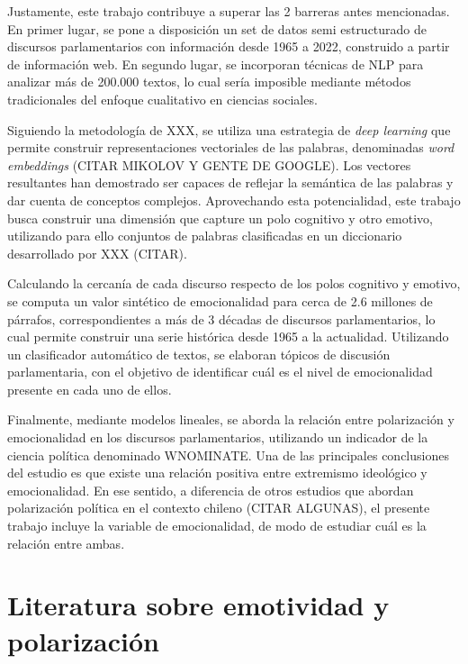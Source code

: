 \documentclass[
  12pt,
]{article}
\begin{document}
Justamente, este trabajo contribuye a superar las 2 barreras antes
mencionadas. En primer lugar, se pone a disposición un set de datos semi
estructurado de discursos parlamentarios con información desde 1965 a
2022, construido a partir de información web. En segundo lugar, se
incorporan técnicas de NLP para analizar más de 200.000 textos, lo cual
sería imposible mediante métodos tradicionales del enfoque cualitativo
en ciencias sociales.

Siguiendo la metodología de XXX, se utiliza una estrategia de \emph{deep
learning} que permite construir representaciones vectoriales de las
palabras, denominadas \emph{word embeddings} (CITAR MIKOLOV Y GENTE DE
GOOGLE). Los vectores resultantes han demostrado ser capaces de reflejar
la semántica de las palabras y dar cuenta de conceptos complejos.
Aprovechando esta potencialidad, este trabajo busca construir una
dimensión que capture un polo cognitivo y otro emotivo, utilizando para
ello conjuntos de palabras clasificadas en un diccionario desarrollado
por XXX (CITAR).

Calculando la cercanía de cada discurso respecto de los polos cognitivo
y emotivo, se computa un valor sintético de emocionalidad para cerca de
2.6 millones de párrafos, correspondientes a más de 3 décadas de
discursos parlamentarios, lo cual permite construir una serie histórica
desde 1965 a la actualidad. Utilizando un clasificador automático de
textos, se elaboran tópicos de discusión parlamentaria, con el objetivo
de identificar cuál es el nivel de emocionalidad presente en cada uno de
ellos.

Finalmente, mediante modelos lineales, se aborda la relación entre
polarización y emocionalidad en los discursos parlamentarios, utilizando
un indicador de la ciencia política denominado WNOMINATE. Una de las
principales conclusiones del estudio es que existe una relación positiva
entre extremismo ideológico y emocionalidad. En ese sentido, a
diferencia de otros estudios que abordan polarización política en el
contexto chileno (CITAR ALGUNAS), el presente trabajo incluye la
variable de emocionalidad, de modo de estudiar cuál es la relación entre
ambas.

\pagebreak

\hypertarget{literatura-sobre-emotividad-y-polarizaciuxf3n}{%
\section{Literatura sobre emotividad y
polarización}\label{literatura-sobre-emotividad-y-polarizaciuxf3n}}
\end{document}
